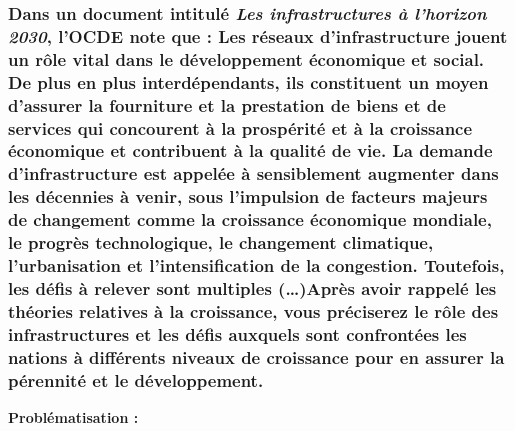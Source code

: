 \newpage %
	\subsubsection*{Dans un document intitulé \guillemetleft \textit{Les infrastructures à l’horizon 2030}\guillemetright,  l’OCDE note que : \newline \guillemetleft Les réseaux d’infrastructure jouent un rôle vital dans le développement économique et social. De plus en plus interdépendants, ils constituent un moyen d’assurer la fourniture et la prestation de biens et de services qui concourent à la prospérité et à la croissance économique et contribuent à la qualité de vie. La demande d’infrastructure est appelée à sensiblement augmenter dans les décennies à venir, sous l’impulsion de facteurs majeurs de changement comme la croissance économique mondiale, le progrès technologique, le changement climatique, l’urbanisation et l’intensification de la congestion. Toutefois, les défis à relever sont multiples (…)\guillemetright \newline \newline Après avoir rappelé les théories relatives à la croissance, vous préciserez le rôle des infrastructures et les défis auxquels sont confrontées les nations à différents niveaux de croissance pour en assurer la pérennité et le développement. }

 \noindent \textbf{Problématisation :} 
